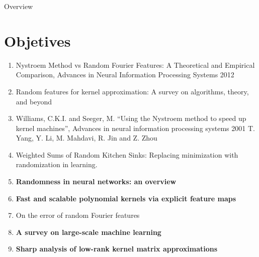


\begin{frame}{Overview}
  \tableofcontents
\end{frame}
\section{Objetives}

\begin{frame}
  \begin{enumerate}
    \item {Nystroem Method vs Random Fourier Features: A Theoretical and Empirical Comparison, Advances in Neural Information Processing Systems 2012}
    
    \item {Random features for kernel approximation: A survey on algorithms, theory, and beyond}
    \item {Williams, C.K.I. and Seeger, M. “Using the Nystroem method to speed up kernel machines”, Advances in neural information processing systems 2001
    T. Yang, Y. Li, M. Mahdavi, R. Jin and Z. Zhou }
    \item Weighted Sums of Random Kitchen Sinks: Replacing minimization with randomization in learning.
    \item \textbf{Randomness in neural networks: an overview}
    \item \textbf{Fast and scalable polynomial kernels via explicit feature maps}
    \item {On the error of random Fourier features}
    \item \textbf{A survey on large-scale machine learning}
    \item \textbf{Sharp analysis of low-rank kernel matrix approximations}
\end{enumerate}

\end{frame}
